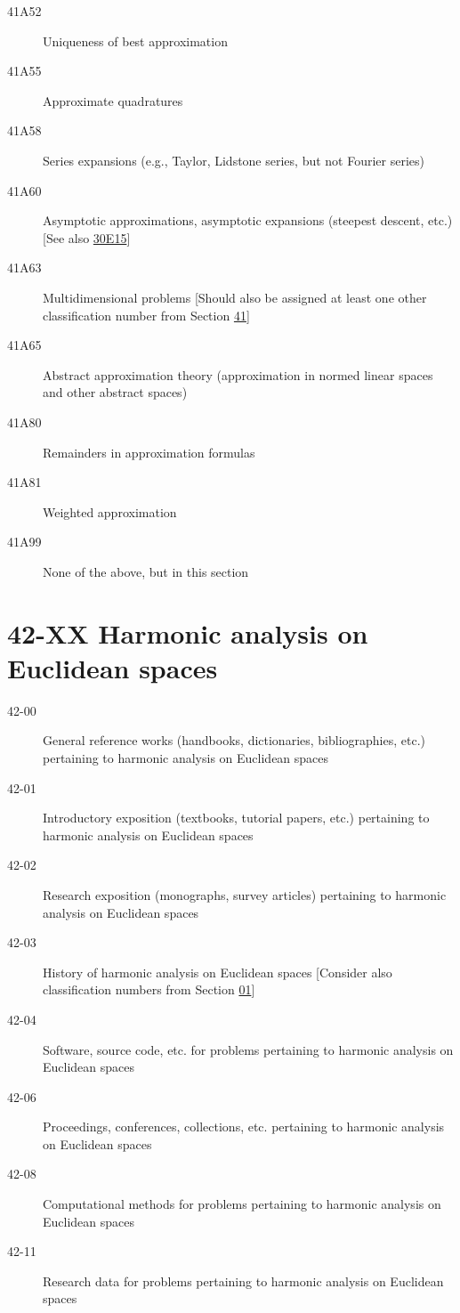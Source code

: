 \documentclass[letterpaper]{article}
\begin{document}
\begin{description}
\item [41A52]\label{41A52} Uniqueness of best approximation
\item [41A55]\label{41A55} Approximate quadratures
\item [41A58]\label{41A58} Series expansions (e.g., Taylor, Lidstone series, but not Fourier series)
\item [41A60]\label{41A60} Asymptotic approximations, asymptotic expansions (steepest descent, etc.) [See also \hyperref[30E15]{30E15}]
\item [41A63]\label{41A63} Multidimensional problems [Should also be assigned at least one other classification number from Section \hyperref[41-XX]{41}]
\item [41A65]\label{41A65} Abstract approximation theory (approximation in normed linear spaces and other abstract spaces)
\item [41A80]\label{41A80} Remainders in approximation formulas
\item [41A81]\label{41A81} Weighted approximation
\item [41A99]\label{41A99} None of the above, but in this section
\end{description}
\section*{42-XX Harmonic analysis on Euclidean spaces }\label{42-XX}
\begin{description}
\item [42-00]\label{42-00} General reference works (handbooks, dictionaries, bibliographies, etc.) pertaining to harmonic analysis on Euclidean spaces
\item [42-01]\label{42-01} Introductory exposition (textbooks, tutorial papers, etc.) pertaining to harmonic analysis on Euclidean spaces
\item [42-02]\label{42-02} Research exposition (monographs, survey articles) pertaining to harmonic analysis on Euclidean spaces
\item [42-03]\label{42-03} History of harmonic analysis on Euclidean spaces [Consider also classification numbers from Section \hyperref[01-XX]{01}]
\item [42-04]\label{42-04} Software, source code, etc. for problems pertaining to harmonic analysis on Euclidean spaces
\item [42-06]\label{42-06} Proceedings, conferences, collections, etc. pertaining to harmonic analysis on Euclidean spaces
\item [42-08]\label{42-08} Computational methods for problems pertaining to harmonic analysis on Euclidean spaces
\item [42-11]\label{42-11} Research data for problems pertaining to harmonic analysis on Euclidean spaces
\end{description}
\end{document}

